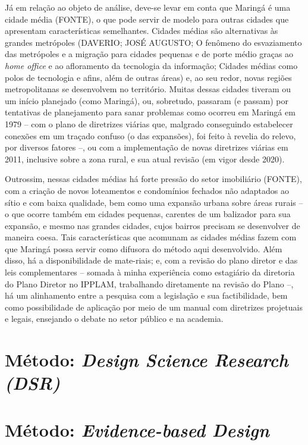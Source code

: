 \documentclass[twoside, 12pt]{book}
\begin{document}
        Já em relação ao objeto de análise, deve-se levar em conta que Maringá é uma cidade média (FONTE), o que pode servir de modelo para outras cidades que apresentam características semelhantes. Cidades médias são alternativas às grandes metrópoles (DAVERIO; JOSÉ AUGUSTO; O fenômeno do esvaziamento das metrópoles e a migração para cidades pequenas e de porte médio graças ao \textit{home office} e ao afloramento da tecnologia da informação; Cidades médias como polos de tecnologia e afins, além de outras áreas) e, ao seu redor, novas regiões metropolitanas se desenvolvem no território. Muitas dessas cidades tiveram ou um início planejado (como Maringá), ou, sobretudo, passaram (e passam) por tentativas de planejamento para sanar problemas  como ocorreu em Maringá em 1979 – com o plano de diretrizes viárias que, malgrado conseguindo estabelecer conexões em um traçado confuso (o das expansões), foi feito à revelia do relevo, por diversos fatores –, ou com a implementação de novas diretrizes viárias em 2011, inclusive sobre a zona rural, e sua atual revisão (em vigor desde 2020). 

        Outrossim, nessas cidades médias há forte pressão do setor imobiliário (FONTE), com a criação de novos loteamentos e condomínios fechados não adaptados ao sítio e com baixa qualidade, bem como uma expansão urbana sobre áreas rurais – o que ocorre também em cidades pequenas, carentes de um balizador para sua expansão, e mesmo nas grandes cidades, cujos bairros precisam se desenvolver de maneira coesa. Tais características que acomunam as cidades médias fazem com que Maringá possa servir como difusora do método aqui desenvolvido. Além disso, há a disponibilidade de mate-riais; e, com a revisão do plano diretor e das leis complementares – somada à minha experiência como estagiário da diretoria do Plano Diretor no IPPLAM, trabalhando diretamente na revisão do Plano –, há um alinhamento entre a pesquisa com a legislação e sua factibilidade, bem como possibilidade de aplicação por meio de um manual com diretrizes projetuais e legais, ensejando o debate no setor público e na academia.


\section{Método: \textit{Design Science Research (DSR)}}


\section{Método: \textit{Evidence-based Design}}
\end{document}

